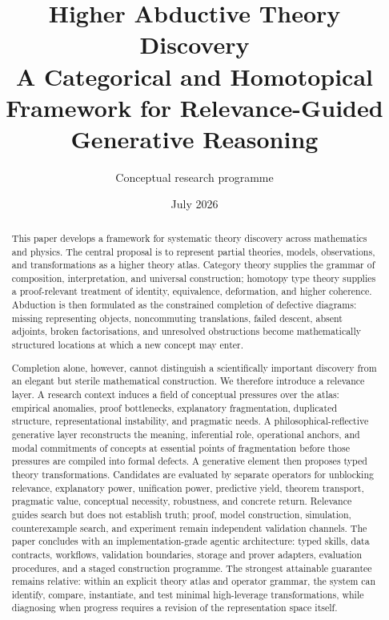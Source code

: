 \documentclass[11pt]{article}
\title{\textbf{Higher Abductive Theory Discovery}\\
\large A Categorical and Homotopical Framework for Relevance-Guided Generative Reasoning}
\author{Conceptual research programme}
\date{July 2026}
\begin{document}
\maketitle

\begin{abstract}
This paper develops a framework for systematic theory discovery across mathematics and physics.
The central proposal is to represent partial theories, models, observations, and transformations as
a higher theory atlas. Category theory supplies the grammar of composition, interpretation, and
universal construction; homotopy type theory supplies a proof-relevant treatment of identity,
equivalence, deformation, and higher coherence. Abduction is then formulated as the constrained
completion of defective diagrams: missing representing objects, noncommuting translations, failed
descent, absent adjoints, broken factorisations, and unresolved obstructions become mathematically
structured locations at which a new concept may enter.

Completion alone, however, cannot distinguish a scientifically important discovery from an elegant
but sterile mathematical construction. We therefore introduce a relevance layer. A research context
induces a field of conceptual pressures over the atlas: empirical anomalies, proof bottlenecks,
explanatory fragmentation, duplicated structure, representational instability, and pragmatic needs.
A philosophical-reflective generative layer reconstructs the meaning, inferential role, operational
anchors, and modal commitments of concepts at essential points of fragmentation before those
pressures are compiled into formal defects. A generative element then proposes typed theory
transformations. Candidates are evaluated by separate operators for unblocking relevance, explanatory
power, unification power, predictive yield, theorem transport, pragmatic value, conceptual necessity,
robustness, and concrete return. Relevance guides search but does not establish truth; proof, model
construction, simulation, counterexample search, and experiment remain independent validation
channels. The paper concludes with an implementation-grade agentic architecture: typed skills, data
contracts, workflows, validation boundaries, storage and prover adapters, evaluation procedures, and
a staged construction programme. The strongest attainable guarantee remains relative: within an
explicit theory atlas and operator grammar, the system can identify, compare, instantiate, and test
minimal high-leverage transformations, while diagnosing when progress requires a revision of the
representation space itself.
\end{abstract}
\end{document}
